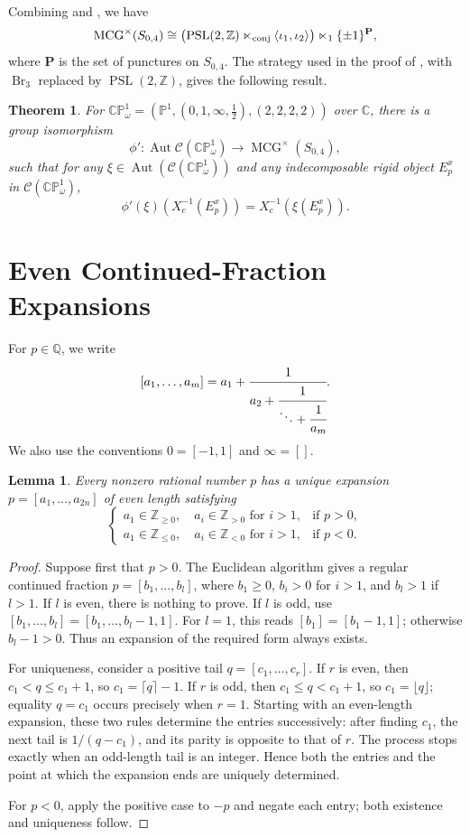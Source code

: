 \documentclass[11pt,a4paper,reqno]{amsart}%
\theoremstyle{plain}
\newtheorem{theorem}{Theorem}[section]
\newtheorem{lemma}[lemma]{Lemma}
\theoremstyle{definition}
\numberwithin{equation}{section}
\numberwithin{equation}{section}
\def\ZZ{\mathbb{Z}}
\def\CC{\mathbb{C}}
\def\wt{\omega}
\newcommand{\MCG}{\operatorname{MCG}}
\def\Aut{\operatorname{Aut}}
\def\Br{\operatorname{Br}}
\def\PSL{\operatorname{PSL}}
\def\CPone{\mathbb{CP}^1_{\wt}}
\def\CCP{\mathcal{C}(\CPone)}
\renewcommand\P{\mathbf{P}} %
\begin{document}
 
 Combining  and , we have
\[
\MCG^\times(S_{0,4})
\cong
\bigl(\PSL(2,\ZZ)\ltimes_{\rm conj}
\langle\iota_1,\iota_2\rangle\bigr)
\ltimes_1\{\pm1\}^{\P},
\]
where $\P$ is the set of punctures   on $S_{0,4}$. The strategy used in the proof of , with $\Br_3$ replaced by $\PSL(2,\ZZ)$, gives the following result.
\begin{theorem}\label{autc=mac}
For $\CPone=(\mathbb{P}^1,(0,1,\infty,\frac{1}{2}),(2,2,2,2))$ over $\CC$, there is a group isomorphism
 \[ \phi': \Aut\CCP  \to   \MCG^\times  (S_{0,4}) , \]   such that for any $\xi\in\Aut(\CCP)$ and any indecomposable rigid object $E_p^x$ in $\CCP$,
 \[\phi'(\xi )(X_c^{-1}(E_{p}^x))=X_c^{-1}(\xi (E_{p}^x)).\] 
\end{theorem}
 
\appendix
\section{Even Continued-Fraction Expansions}\label{app:even-cf}
For $p\in\mathbb Q$, we write
\[
[a_1,\ldots,a_m]=a_1+\cfrac{1}{a_2+\cfrac{1}{\ddots+\cfrac{1}{a_m}}}.
\]
We also use the conventions $0=[-1,1]$ and $\infty=[]$.

\begin{lemma}\label{lem:even-cf}
Every nonzero rational number $p$ has a unique expansion $p=[a_1,\ldots,a_{2n}]$ of even length satisfying
\[
\begin{cases}
a_1\in\mathbb Z_{\geq0},\quad a_i\in\mathbb Z_{>0}  \text{ for }i>1, & \text{if }p>0,\\
a_1\in\mathbb Z_{\leq0},\quad a_i\in\mathbb Z_{<0} \text{ for }i>1, & \text{if }p<0.
\end{cases}
\]
\end{lemma}

\begin{proof}
Suppose first that $p>0$. The Euclidean algorithm gives a regular continued fraction $p=[b_1,\ldots,b_l]$, where $b_1\geq0$, $b_i>0$ for $i>1$, and $b_l>1$ if $l>1$. If $l$ is even, there is nothing to prove. If $l$ is odd, use $[b_1,\ldots,b_l]=[b_1,\ldots,b_l-1,1]$. For $l=1$, this reads $[b_1]=[b_1-1,1]$; otherwise $b_l-1>0$. Thus an expansion of the required form always exists.

For uniqueness, consider a positive tail $q=[c_1,\ldots,c_r]$. If $r$ is even, then $c_1<q\leq c_1+1$, so $c_1=\lceil q\rceil-1$. If $r$ is odd, then $c_1\leq q<c_1+1$, so $c_1=\lfloor q\rfloor$; equality $q=c_1$ occurs precisely when $r=1$. Starting with an even-length expansion, these two rules determine the entries successively: after finding $c_1$, the next tail is $1/(q-c_1)$, and its parity is opposite to that of $r$. The process stops exactly when an odd-length tail is an integer. Hence both the entries and the point at which the expansion ends are uniquely determined.

For $p<0$, apply the positive case to $-p$ and negate each entry; both existence and uniqueness follow.
\end{proof}
\end{document}
